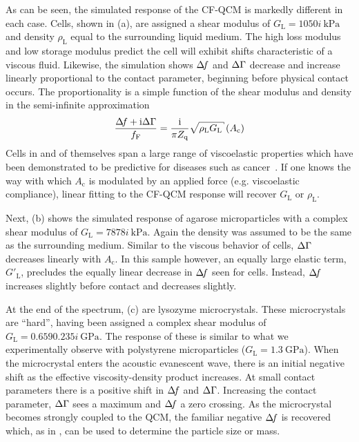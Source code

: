As can be seen, the simulated response of the CF-QCM is markedly different
in each case. Cells, shown in (a), are assigned a
shear modulus of $G_\mathrm{L}=\SI{10+50i}{\kilo\pascal}$ and density
$\rho_\mathrm{L}$ equal to the surrounding liquid medium.  The high loss
modulus and low storage modulus predict the cell will exhibit shifts
characteristic of a viscous fluid.  Likewise, the simulation shows $\Delta\!f$
and $\Delta\Gamma$ decrease and increase linearly proportional to the contact
parameter, beginning before physical contact occurs.  The proportionality
is a simple function of the shear modulus and density in the
semi-infinite approximation~\cite{flanigan2000contact}~\cite{kanazawa1985frequency}
\begin{equation}
 \frac{\df+\mi\dg}{f_\mathrm{F}}=\frac{\mi}{\pi Z_\mathrm{q}}\sqrt{\rho_\mathrm{L} G_\mathrm{L}}
 \left(A_\mathrm{c}\right)
\end{equation}
 Cells in and of
themselves span a large range of viscoelastic properties which have been
demonstrated to be predictive for diseases such as
cancer~\cite{rebelo2013comparison}.  If one knows the way with which
$A_\mathrm{c}$ is modulated by an applied force (e.g. viscoelastic
compliance), linear fitting to
the CF-QCM response will recover $G_\mathrm{L}$ or $\rho_\mathrm{L}$.

Next, (b) shows the simulated response of agarose
microparticles with a complex shear modulus of
$G_\mathrm{L}=\SI{78+78i}{\kilo\pascal}$. Again the density was assumed to
be the same as the surrounding medium.  Similar to the viscous behavior of
cells, $\Delta\Gamma$ decreases linearly with $A_\mathrm{c}$.  In this
sample however, an equally large elastic term, $G'_\mathrm{L}$, precludes
the equally linear decrease in $\Delta\!f$ seen for cells.  Instead, $\Delta\!f$ increases
slightly before contact and decreases slightly.

At the end of the spectrum, (c) are lysozyme
microcrystals.  These microcrystals are ``hard'', having been assigned a
complex shear modulus of $G_\mathrm{L}=\SI{0.659+0.235i}{\giga\pascal}$.
The response of these is similar to what we experimentally observe with
polystyrene microparticles ($G_\mathrm{L}=\SI{1.3}{\giga\pascal}$).  When
the microcrystal enters the acoustic evanescent wave, there is an initial
negative shift as the effective viscosity-density product increases.  At
small contact parameters there is a positive shift in $\Delta\!f$ and $\Delta\Gamma$.
Increasing the contact parameter, $\Delta\Gamma$ sees a maximum and $\Delta\!f$ a zero
crossing.  As the microcrystal becomes strongly coupled to the QCM, the
familiar negative $\Delta\!f$ is recovered which, as in ,
can be used to determine the particle size or mass.


